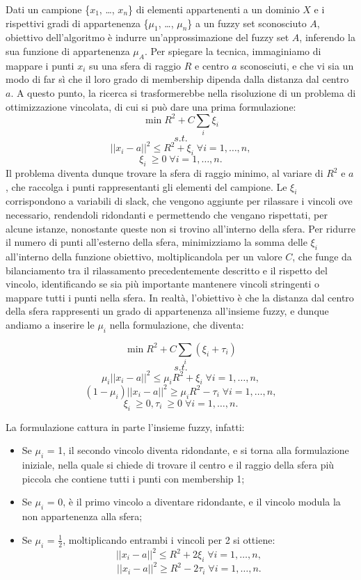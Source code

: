 \documentclass[12pt,a4paper]{report}
\begin{document}
Dati un campione  \{$x_1$, \dots , $x_n$\} di elementi appartenenti a un dominio $X$ e i rispettivi gradi di appartenenza  \{$\mu_1$, \dots , $\mu_n$\}  a un fuzzy set sconosciuto $A$, obiettivo dell'algoritmo è indurre un'approssimazione del fuzzy set $A$,  inferendo la sua funzione di appartenenza $\mu_A$. Per spiegare la tecnica, immaginiamo di mappare i punti  $x_i$ su una sfera di raggio $R$  e centro $a$ sconosciuti, e che vi sia un modo di far sì che il  loro  grado di membership dipenda dalla distanza dal centro $a$.
A questo punto, la ricerca si trasformerebbe nella risoluzione di un problema di ottimizzazione vincolata, di cui si può dare una prima formulazione:
\[ \min R^2 + C\sum_{i} \xi_{i}\]
\[s.t.\]
\[||x_i - a||^2  \leq R^2 + \xi_{i} \; \forall i = 1, \dots, n,\]
\[ \xi_{i}\ \geq 0 \; \forall i = 1, \dots, n.\]
Il problema diventa dunque trovare la sfera di raggio minimo, al variare di $R^2$ e $a$, che raccolga i punti rappresentanti gli elementi del campione.  
Le $\xi_i$ corrispondono a variabili di slack, che vengono aggiunte per rilassare i vincoli ove necessario, rendendoli ridondanti e permettendo che vengano rispettati, per alcune istanze, nonostante queste non si trovino all'interno della sfera. Per ridurre il numero di punti all'esterno della sfera, minimizziamo la somma delle $\xi_i$ all'interno della funzione obiettivo, moltiplicandola per un valore $C$, che funge da bilanciamento tra il rilassamento precedentemente descritto e il rispetto del vincolo, identificando se sia più importante mantenere vincoli stringenti o mappare tutti i punti nella sfera.
In realtà, l'obiettivo è che la distanza dal centro della sfera rappresenti un grado di appartenenza all'insieme fuzzy, e dunque andiamo a inserire le $\mu_i$ nella formulazione, che diventa:

\[\min R^2 + C\sum_{i} (\xi_{i} + \tau_{i})\]
\[s.t.\]
\[ \mu_i||x_i - a||^2  \leq \mu_i R^2 + \xi_{i} \; \forall i = 1, \dots, n,\]
\[ (1 - \mu_i)||x_i - a||^2  \geq \mu_i R^2 - \tau_{i}  \; \forall i = 1, \dots, n,\]
\[ \xi_{i}\ \geq 0, \tau_{i}\ \geq 0  \; \forall i = 1, \dots, n.\]

La formulazione cattura in parte l'insieme fuzzy, infatti:
\begin{itemize}
  \item Se  $\mu_i$ = 1, il secondo vincolo diventa ridondante, e si torna alla formulazione iniziale, nella quale si chiede di trovare il centro  e il raggio della sfera più piccola che contiene tutti i punti con membership 1;
  \item Se   $\mu_i$ = 0, è il primo vincolo a diventare ridondante, e il vincolo modula la non appartenenza alla sfera;		
  \item Se   $\mu_i$ = $\frac{1}{2}$, moltiplicando entrambi i vincoli per 2 si ottiene:
\[ ||x_i - a||^2  \leq R^2 + 2\xi_{i} \; \forall i = 1, \dots, n,\]
\[ ||x_i - a||^2  \geq R^2 - 2\tau_{i}\; \forall i = 1, \dots, n.\]
\end{itemize}
\end{document}
